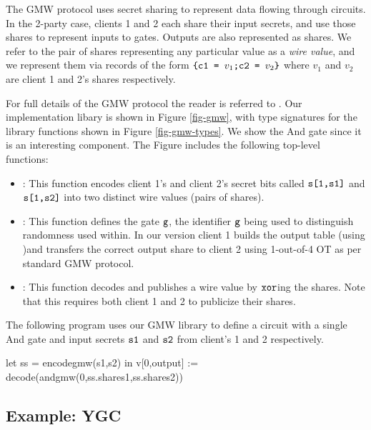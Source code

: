The GMW protocol uses secret sharing to represent data flowing through
circuits. In the 2-party case, clients 1 and 2 each share their input
secrets, and use those shares to represent inputs to gates. Outputs
are also represented as shares. We refer to the pair of shares
representing any particular value as a \emph{wire value}, and
we represent them via records of the form
$
\texttt{\{c1 = } v_1\texttt{;c2 = } v_2\texttt{\}} 
$
where $v_1$ and $v_2$ are client 1 and 2's shares respectively.

For full details of the GMW protocol the reader is referred to
\cite{evans2018pragmatic}. Our implementation libary is shown in
Figure \ref{fig-gmw}, with type signatures for the library functions
shown in Figure \ref{fig-gmw-types}. We show the And gate since it is
an interesting component. The Figure includes the
following top-level functions:
\begin{itemize}
\item {}: This function encodes client 1's and client 2's
  secret bits called $\texttt{s[1,s1]}$ and $\texttt{s[1,s2]}$ into two
  distinct wire values (pairs of shares).
\item {}: This function defines the gate $\texttt{g}$, the
  identifier $\texttt{g}$ being used to distinguish randomness used
  within.  In our version client 1 builds the output table (using
  )and transfers the correct output share to client 2
  using 1-out-of-4 OT as per standard GMW protocol.
\item {}: This function decodes and publishes a wire value
  by $\texttt{xor}$ing the shares. Note that this requires both client 1
  and 2 to publicize their shares.
\end{itemize}
\begin{example}
  \label{example-gmw-andcircuit}
The following program uses our GMW library to define
a circuit with a single And gate and input secrets $\texttt{s1}$ and
$\texttt{s2}$ from client's 1 and 2 respectively. 
{\small
  \begin{verbatimtab}
  let ss = encodegmw(s1,s2) in v[0,output] := decode(andgmw(0,ss.shares1,ss.shares2)) \end{verbatimtab}
}
\end{example}

\subsection{Example: YGC}
\label{section-metalang-ygc}

